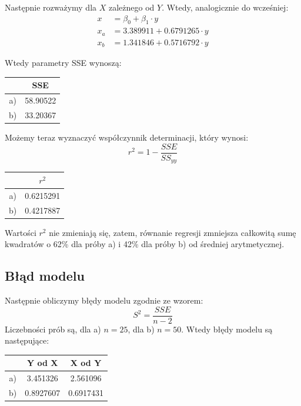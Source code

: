 \documentclass{article}
\begin{document}
Następnie rozważymy dla $X$ zależnego od $Y$. Wtedy, analogicznie do wcześniej:
\begin{align*}
x & = \beta_0 + \beta_1 \cdot y \\
x_a & = 3.389911  +  0.6791265 \cdot y \\
x_b & = 1.341846  +  0.5716792 \cdot y
\end{align*}

Wtedy parametry SSE wynoszą:
\begin{center} \begin{tabular}{|c|c|} \hline
& SSE \\ \hline
a) & 58.90522 \\ \hline
b) & 33.20367 \\ \hline
\end{tabular} \end{center}

Możemy teraz wyznaczyć współczynnik determinacji, który wynosi:
\[ r^2 = 1 - \frac{SSE}{SS_{yy}} \]
\begin{center} \begin{tabular}{|c|c|} \hline
& $r^2$ \\ \hline
a) & 0.6215291 \\ \hline
b) & 0.4217887 \\ \hline
\end{tabular} \end{center}

Wartości $r^2$ nie zmieniają się, zatem, równanie regresji zmniejsza całkowitą sumę kwadratów o 62\% dla próby a) i 42\% dla próby b) od średniej arytmetycznej.

\subsection{Błąd modelu}
Następnie obliczymy błędy modelu zgodnie ze wzorem:
\[ S^2 = \frac{SSE}{n-2} \]
Liczebności prób są, dla a) $n = 25$, dla b) $n = 50$. Wtedy błędy modelu są następujące:
\begin{center} \begin{tabular}{|c|c|c|} \hline
& Y od X & X od Y \\ \hline
a) & 3.451326 & 2.561096 \\ \hline
b) & 0.8927607 & 0.6917431 \\ \hline
\end{tabular} \end{center}
\end{document}
